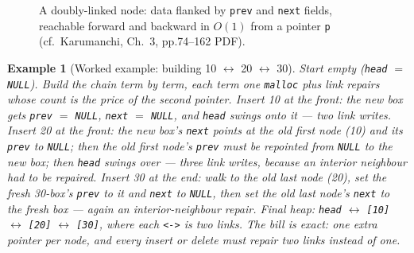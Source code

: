 \documentclass[11pt]{article}
\newtheorem{example}{Example}[section]
\begin{document}
\begin{figure}[h]
  \centering
  \caption{A doubly-linked node: data flanked by \texttt{prev} and \texttt{next} fields, reachable forward and backward in $O(1)$ from a pointer \texttt{p} (cf.\ Karumanchi, Ch.~3, pp.74--162 PDF).}
  \label{fig:dll-node}
\end{figure}

\begin{example}[Worked example: building 10 $\leftrightarrow$ 20 $\leftrightarrow$ 30]
Start empty (\texttt{head} $=$ \texttt{NULL}). Build the chain term by term, each term one \texttt{malloc} plus link repairs whose count is the price of the second pointer. Insert 10 at the front: the new box gets \texttt{prev} $=$ \texttt{NULL}, \texttt{next} $=$ \texttt{NULL}, and \texttt{head} swings onto it --- two link writes. Insert 20 at the front: the new box's \texttt{next} points at the old first node (10) and its \texttt{prev} to \texttt{NULL}; then the old first node's \texttt{prev} must be repointed from \texttt{NULL} to the new box; then \texttt{head} swings over --- three link writes, because an interior neighbour had to be repaired. Insert 30 at the end: walk to the old last node (20), set the fresh 30-box's \texttt{prev} to it and \texttt{next} to \texttt{NULL}, then set the old last node's \texttt{next} to the fresh box --- again an interior-neighbour repair. Final heap: \texttt{head} $\leftrightarrow$ \texttt{[10]} $\leftrightarrow$ \texttt{[20]} $\leftrightarrow$ \texttt{[30]}, where each \texttt{<->} is two links. The bill is exact: one extra pointer per node, and every insert or delete must repair \emph{two} links instead of one.
\end{example}
\end{document}
